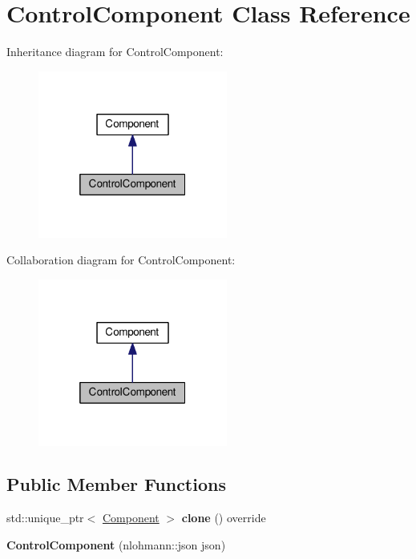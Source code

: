 \hypertarget{classControlComponent}{\section{Control\-Component Class Reference}
\label{classControlComponent}
}


Inheritance diagram for Control\-Component\-:
\nopagebreak
\begin{figure}[H]
\begin{center}
\leavevmode
\includegraphics[width=176pt]{classControlComponent__inherit__graph}
\end{center}
\end{figure}


Collaboration diagram for Control\-Component\-:
\nopagebreak
\begin{figure}[H]
\begin{center}
\leavevmode
\includegraphics[width=176pt]{classControlComponent__coll__graph}
\end{center}
\end{figure}
\subsection*{Public Member Functions}
\begin{DoxyCompactItemize}
\item 
\hypertarget{classControlComponent_aaf2eb2415f762178bbcbf673c7cdfa1c}{std\-::unique\-\_\-ptr$<$ \hyperlink{classComponent}{Component} $>$ {\bfseries clone} () override}\label{classControlComponent_aaf2eb2415f762178bbcbf673c7cdfa1c}

\item 
\hypertarget{classControlComponent_a84410c1ccb6e7b1581a099c0b72fc2dd}{{\bfseries Control\-Component} (nlohmann\-::json json)}\label{classControlComponent_a84410c1ccb6e7b1581a099c0b72fc2dd}

\end{DoxyCompactItemize}
